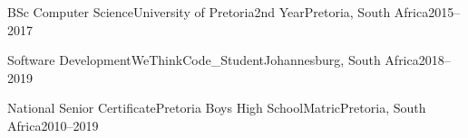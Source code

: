 
\begin{cveducationentry}{BSc Computer Science}{University of Pretoria}{2nd Year}{Pretoria, South Africa}{2015--2017}
\end{cveducationentry}
\begin{cveducationentry}{Software Development}{WeThinkCode\_}{Student}{Johannesburg, South Africa}{2018--2019}
\end{cveducationentry}
\begin{cveducationentry}{National Senior Certificate}{Pretoria Boys High School}{Matric}{Pretoria, South Africa}{2010--2019}
\end{cveducationentry}
